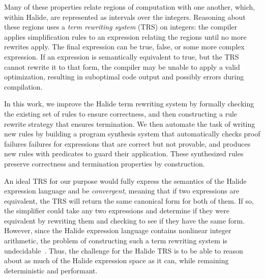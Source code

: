 \documentclass[sigplan,10pt,review,anonymous]{acmart}\settopmatter{printfolios=true,printccs=false,printacmref=false}
\begin{document}
Many of these properties relate regions of computation with one another,
which, within Halide, are represented as intervals over the integers.
Reasoning about these regions uses a \textit{term rewriting system}
(TRS) on integers: the compiler applies simplification rules to an expression relating
the regions until no more rewrites apply.  The final expression can be
true, false, or some more complex expression. If an expression is semantically equivalent to true,
but the TRS cannot rewrite it to that form, the compiler may be unable to apply a valid optimization,
resulting in suboptimal code output and possibly errors during compilation.

In this work, we improve the Halide term rewriting system by formally checking the existing
set of rules to ensure correctness, and then constructing a rule rewrite strategy that 
ensures termination.  We then automate the task of writing new rules by building a program
synthesis system that automatically checks proof failures failures for expressions that are
correct but not provable, and produces new rules with predicates to guard their application.
These synthesized rules preserve correctness and termination properties by construction.

An ideal TRS for our purpose would fully express the semantics of the Halide
expression language and be \emph{convergent}, meaning that if two expressions
are equivalent, the TRS will return the same canonical form for both of them. If
so, the simplifier could take any two expressions and determine if they were
equivalent by rewriting them and checking to see if they have the same form.
However, since the Halide expression language contains nonlinear integer
arithmetic, the problem of constructing such a term rewriting system is
undecidable~\cite{matiyasevich1993hilberts10th}. Thus, the challenge for the
Halide TRS is to be able to reason about as much of the Halide expression space
as it can, while remaining deterministic and performant.

\end{document}
